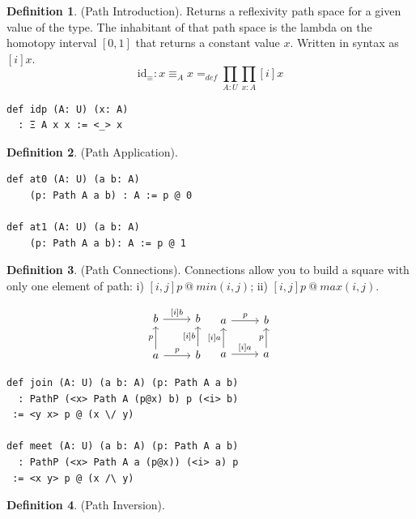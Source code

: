 \documentclass{article}
\theoremstyle{definition}
\newtheorem{definition}{Definition}
\begin{document}
\begin{definition} (Path Introduction).
Returns a reflexivity path space for a given value of the type.
The inhabitant of that path space is the lambda on the homotopy
interval $[0,1]$ that returns a constant value $x$. Written in
syntax as $[i]x$.
$$
  \mathrm{id_\equiv} : x \equiv_A x =_{def} \prod_{A:U}\prod_{x:A} [i] x
$$
\begin{lstlisting}[mathescape=true]
def idp (A: U) (x: A)
  : Ξ A x x := <_> x
\end{lstlisting}
\end{definition}

\begin{definition} (Path Application).
\begin{lstlisting}[mathescape=true]
def at0 (A: U) (a b: A)
    (p: Path A a b) : A := p @ 0

def at1 (A: U) (a b: A)
    (p: Path A a b): A := p @ 1
\end{lstlisting}
\end{definition}

\newpage

\begin{definition} (Path Connections).
Connections allow you to build a square
with only one element of path: i) $[i,j] p\ @\ min(i,j)$;
ii) $[i,j] p\ @\ max(i,j)$.

\[
\begin{array}{cc}
  \begin{tikzcd}
    b \arrow[r, "{[i]b}"] & b \\
    a \arrow[u, "p"] \arrow[r, "p"] & b \arrow[u, "{[i]b}"]
  \end{tikzcd}
  \begin{tikzcd}
    a \arrow[r, "p"] & b \\
    a \arrow[u, "{[i]a}"] \arrow[r, "{[i]a}"] & a \arrow[u, "p"]
  \end{tikzcd}
\end{array}
\]

\begin{lstlisting}[mathescape=true]
def join (A: U) (a b: A) (p: Path A a b)
  : PathP (<x> Path A (p@x) b) p (<i> b)
 := <y x> p @ (x \/ y)

def meet (A: U) (a b: A) (p: Path A a b)
  : PathP (<x> Path A a (p@x)) (<i> a) p
 := <x y> p @ (x /\ y)
\end{lstlisting}
\end{definition}

\begin{definition} (Path Inversion).
\end{definition}
\end{document}
